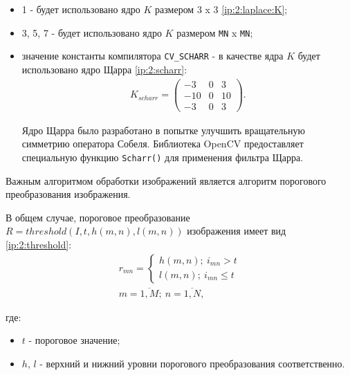 \begin{itemize}
\begin{itemize}
		\begin{itemize}

			\item 1 - будет использовано ядро $K$ размером 3 x 3 \eqref{ip:2:laplace:K};
			\item 3, 5, 7 - будет использовано ядро $K$ размером \verb|MN| x \verb|MN|;
			\item значение константы компилятора \verb|CV_SCHARR| - в качестве ядра $K$ будет использовано ядро Щарра \eqref{ip:2:scharr}:
			\begin{gather}
				\label{ip:2:scharr}
				K_{scharr} = \left(
				\begin{array}{ccc}
					-3 & 0 & 3 \\
					-10 & 0 & 10 \\
					-3 & 0 & 3
				\end{array}
				\right).
			\end{gather}

			Ядро Щарра было разработано в попытке улучшить вращательную симметрию оператора Собеля. Библиотека OpenCV предоставляет специальную функцию \verb|Scharr()| для применения фильтра Щарра.

		\end{itemize}

	\end{itemize}

\end{itemize}


Важным алгоритмом обработки изображений является алгоритм порогового преобразования изображения.

В общем случае, пороговое преобразование $R = threshold(I, t, h(m, n), l(m, n))$ изображения имеет вид \eqref{ip:2:threshold}:
\begin{gather}
	\label{ip:2:threshold}
	r_{mn} =
	\begin{cases}
		h(m, n) ;~ i_{mn} > t \\
		l(m, n) ;~ i_{mn} \le t
	\end{cases} \\
	m = \overline{1, M} ;~ n = \overline{1, N},
\end{gather}

где:

\begin{itemize}

	\item $t$ - пороговое значение;
	\item $h$, $l$ - верхний и нижний уровни порогового преобразования соответственно.

\end{itemize}

